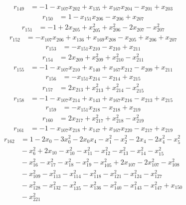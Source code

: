\[\begin{aligned}
r_{149}&=-1-x_{107}x_{202}+x_{135}+x_{167}x_{204}-x_{201}+x_{203}
\end{aligned}\]
\[\begin{aligned}
r_{150}&=1-x_{151}x_{206}-x_{206}+x_{207}
\end{aligned}\]
\[\begin{aligned}
r_{151}&=-1+2x_{205}+x_{205}^{2}+x_{206}^{2}-2x_{207}-x_{207}^{2}
\end{aligned}\]
\[\begin{aligned}
r_{152}&=-x_{107}x_{206}+x_{136}+x_{169}x_{208}-x_{205}+x_{206}+x_{207}
\end{aligned}\]
\[\begin{aligned}
r_{153}&=-x_{151}x_{210}-x_{210}+x_{211}
\end{aligned}\]
\[\begin{aligned}
r_{154}&=2x_{209}+x_{209}^{2}+x_{210}^{2}-x_{211}^{2}
\end{aligned}\]
\[\begin{aligned}
r_{155}&=-1-x_{107}x_{210}+x_{140}+x_{167}x_{212}-x_{209}+x_{211}
\end{aligned}\]
\[\begin{aligned}
r_{156}&=-x_{151}x_{214}-x_{214}+x_{215}
\end{aligned}\]
\[\begin{aligned}
r_{157}&=2x_{213}+x_{213}^{2}+x_{214}^{2}-x_{215}^{2}
\end{aligned}\]
\[\begin{aligned}
r_{158}&=-1-x_{107}x_{214}+x_{143}+x_{167}x_{216}-x_{213}+x_{215}
\end{aligned}\]
\[\begin{aligned}
r_{159}&=-x_{151}x_{218}-x_{218}+x_{219}
\end{aligned}\]
\[\begin{aligned}
r_{160}&=2x_{217}+x_{217}^{2}+x_{218}^{2}-x_{219}^{2}
\end{aligned}\]
\[\begin{aligned}
r_{161}&=-1-x_{107}x_{218}+x_{147}+x_{167}x_{220}-x_{217}+x_{219}
\end{aligned}\]
\[\begin{aligned}
r_{162}&=1-2x_{0}-3x_{0}^{2}-2x_{0}x_{4}-x_{1}^{2}-x_{2}^{2}-2x_{4}-2x_{4}^{2}-x_{5}^{2}\\
&{}-x_{6}^{2}+2x_{10}-x_{10}^{2}-x_{11}^{2}-x_{12}^{2}-x_{13}^{2}-x_{14}^{2}-x_{15}^{2}\\
&{}-x_{16}^{2}-x_{17}^{2}-x_{18}^{2}-x_{19}^{2}-x_{105}^{2}+2x_{107}-2x_{107}^{2}-x_{108}^{2}\\
&{}-x_{109}^{2}-x_{113}^{2}-x_{114}^{2}-x_{118}^{2}-x_{121}^{2}-x_{124}^{2}-x_{127}^{2}\\
&{}-x_{128}^{2}-x_{132}^{2}-x_{135}^{2}-x_{136}^{2}-x_{140}^{2}-x_{143}^{2}-x_{147}^{2}+x_{150}\\
&{}-x_{221}^{2}
\end{aligned}\]
